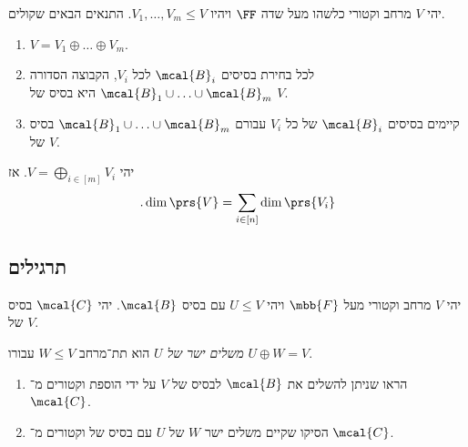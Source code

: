 \documentclass[a4paper,10pt,twoside,openany]{book}
\begin{document}
\begin{proposition}
יהי
$V$
מרחב וקטורי כלשהו מעל שדה
$\FF$
ויהיו
$V_1, \ldots, V_m \leq V$.
התנאים הבאים שקולים.

\begin{enumerate}
\item $V = V_1 \oplus \ldots \oplus V_m$.
\item לכל בחירת בסיסים
$\mcal{B}_i$
לכל
$V_i$,
הקבוצה הסדורה
$\mcal{B}_1 \cup \ldots \cup \mcal{B}_m$
היא בסיס של
$V$.
\item
קיימים בסיסים
$\mcal{B}_i$
של כל
$V_i$
עבורם
$\mcal{B}_1 \cup \ldots \cup \mcal{B}_m$
בסיס של
$V$.
\end{enumerate}
\end{proposition}

\begin{corollary}
יהי
$V = \bigoplus_{i \in [m]} V_i$.
אז
\begin{align*}
\text{.} \dim \prs{V} = \sum_{i \in [n]} \dim \prs{V_i}
\end{align*}
\end{corollary}

\subsection{תרגילים}

\begin{exercisechap}
יהי
$V$
מרחב וקטורי מעל
$\mbb{F}$
ויהי
$U \leq V$
עם בסיס
$\mcal{B}$.
יהי
$\mcal{C}$
בסיס של
$V$.

\emph{משלים ישר של
$U$}
הוא תת־מרחב
$W \leq V$
עבורו
$U \oplus W = V$.

\begin{enumerate}
\item הראו שניתן להשלים את
$\mcal{B}$
לבסיס של
$V$
על ידי הוספת וקטורים מ־%
$\mcal{C}$.

\item הסיקו שקיים משלים ישר
$W$
של
$U$
עם בסיס של וקטורים מ־%
$\mcal{C}$.
\end{enumerate}
\end{exercisechap}
\end{document}
